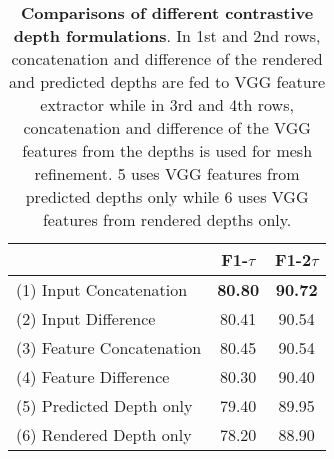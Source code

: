\begin{table}[ht]
\begin{center}
\footnotesize
\begin{tabular}{ l c c }
\toprule[1pt]
 &F1-$\tau$ &F1-2$\tau$ \\ \hline
(1) Input Concatenation \qquad \qquad  \qquad  \qquad  \qquad  & \textbf{80.80} & \textbf{90.72} \\
(2) Input Difference & 80.41 & 90.54 \\
(3) Feature Concatenation   & 80.45 & 90.54 \\
(4) Feature Difference & 80.30 & 90.40 \\
(5) Predicted Depth only & 79.40 & 89.95 \\
(6) Rendered Depth only & 78.20 & 88.90 \\
\bottomrule[1pt]
\end{tabular}
\end{center}
\vspace{-4mm}
\caption{\textbf{Comparisons of different contrastive depth formulations}. In 1st and 2nd rows, concatenation and difference of the rendered and predicted depths are fed to VGG feature extractor while in 3rd and 4th rows, concatenation and difference of the VGG features from the depths is used for mesh refinement. 5 uses VGG features from predicted depths only while 6 uses VGG features from rendered depths only.}
\label{table:contrastive_feature_extraction}
\end{table}


